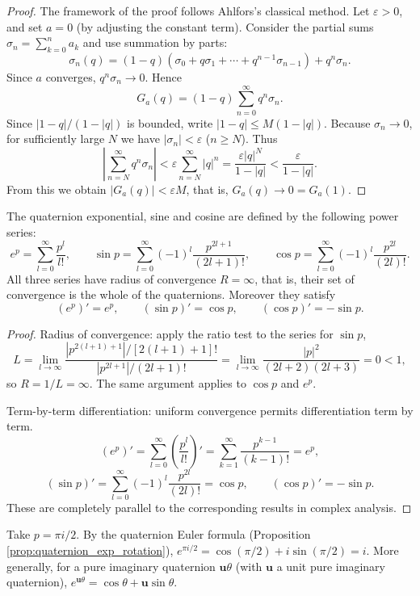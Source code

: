 \begin{proof}
The framework of the proof follows Ahlfors's classical method. Let $\varepsilon>0$, and set $a=0$ (by adjusting the constant term). Consider the partial sums $\sigma_n=\sum_{k=0}^n a_k$ and use summation by parts:
\[
\sigma_n(q)=(1-q)(\sigma_0+q\sigma_1+\cdots+q^{n-1}\sigma_{n-1})+q^n\sigma_n.
\]
Since $a$ converges, $q^n\sigma_n\to 0$. Hence
\[
G_a(q)=(1-q)\sum_{n=0}^\infty q^n\sigma_n.
\]
Since $|1-q|/(1-|q|)$ is bounded, write $|1-q|\le M(1-|q|)$. Because $\sigma_n\to 0$, for sufficiently large $N$ we have $|\sigma_n|<\varepsilon$ ($n\ge N$). Thus
\[
\left|\sum_{n=N}^\infty q^n\sigma_n\right|<\varepsilon\sum_{n=N}^\infty|q|^n=\frac{\varepsilon|q|^N}{1-|q|}<\frac{\varepsilon}{1-|q|}.
\]
From this we obtain $|G_a(q)|<\varepsilon M$, that is, $G_a(q)\to 0=G_a(1)$.
\end{proof}

\begin{theorem}\label{thm:q_exp_sin_cos}
The quaternion exponential, sine and cosine are defined by the following power series:
\[
e^p=\sum_{l=0}^\infty\frac{p^l}{l!},\qquad
\sin p=\sum_{l=0}^\infty(-1)^l\frac{p^{2l+1}}{(2l+1)!},\qquad
\cos p=\sum_{l=0}^\infty(-1)^l\frac{p^{2l}}{(2l)!}.
\]
All three series have radius of convergence $R=\infty$, that is, their set of convergence is the whole of the quaternions. Moreover they satisfy
\[
(e^p)'=e^p,\qquad (\sin p)'=\cos p,\qquad (\cos p)'=-\sin p.
\]
\end{theorem}

\begin{proof}
Radius of convergence: apply the ratio test to the series for $\sin p$,
\[
L=\lim_{l\to\infty}\frac{|p^{2(l+1)+1}|/[2(l+1)+1]!}{|p^{2l+1}|/(2l+1)!}
=\lim_{l\to\infty}\frac{|p|^2}{(2l+2)(2l+3)}=0<1,
\]
so $R=1/L=\infty$. The same argument applies to $\cos p$ and $e^p$.

Term-by-term differentiation: uniform convergence permits differentiation term by term.
\[
(e^p)'=\sum_{l=0}^\infty\left(\frac{p^l}{l!}\right)'=\sum_{k=1}^\infty\frac{p^{k-1}}{(k-1)!}=e^p,
\]
\[
(\sin p)'=\sum_{l=0}^\infty(-1)^l\frac{p^{2l}}{(2l)!}=\cos p,\qquad
(\cos p)'=-\sin p.
\]
These are completely parallel to the corresponding results in complex analysis.
\end{proof}

\begin{example}\label{ex:q_exp_calc}
Take $p=\pi i/2$. By the quaternion Euler formula (Proposition \ref{prop:quaternion_exp_rotation}), $e^{\pi i/2}=\cos(\pi/2)+i\sin(\pi/2)=i$. More generally, for a pure imaginary quaternion $\mathbf{u}\theta$ (with $\mathbf{u}$ a unit pure imaginary quaternion), $e^{\mathbf{u}\theta}=\cos\theta+\mathbf{u}\sin\theta$.
\end{example}

